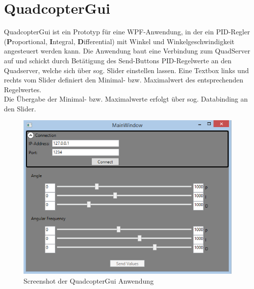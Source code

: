 \documentclass[]{scrartcl}
\begin{document}
\section{QuadcopterGui}
QuadcopterGui ist ein Prototyp für eine WPF-Anwendung, in der ein PID-Regler (\textbf{P}roportional, \textbf{I}ntegral, \textbf{D}ifferential) mit Winkel und Winkelgeschwindigkeit angesteuert werden kann. Die Anwendung baut eine Verbindung zum QuadServer auf und schickt durch Betätigung des Send-Buttons PID-Regelwerte an den Quadserver, welche sich über sog. Slider einstellen lassen. Eine Textbox links und rechts vom Slider definiert den Minimal- bzw. Maximalwert des entsprechenden Regelwertes.\\
Die Übergabe der Minimal- bzw. Maximalwerte erfolgt über sog. Databinding an den Slider.

\begin{figure}[h]
\includegraphics[scale=1]{img/gui.png} 
\caption{Screenshot der QuadcopterGui Anwendung}
\end{figure}

\newpage
\end{document}
